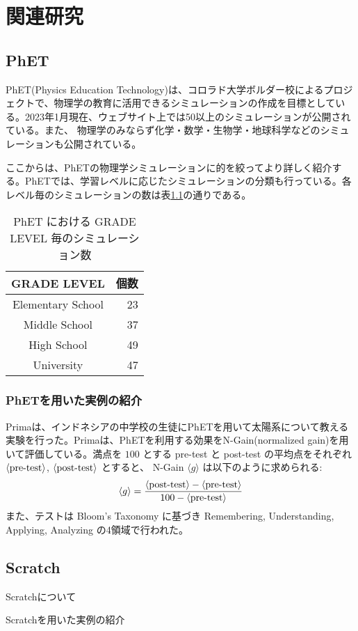 \chapter{関連研究} \label{related}

\section{PhET}

PhET(Physics Education Technology)\cite{Perkins2006PhETIS}は、コロラド大学ボルダー校によるプロジェクトで、物理学の教育に活用できるシミュレーションの作成を目標としている。2023年1月現在、ウェブサイト\cite{PhET}上では50以上のシミュレーションが公開されている。また、
物理学のみならず化学・数学・生物学・地球科学などのシミュレーションも公開されている。

ここからは、PhETの物理学シミュレーションに的を絞ってより詳しく紹介する。PhETでは、学習レベルに応じたシミュレーションの分類も行っている。各レベル毎のシミュレーションの数は表\ref{PhET_sim_count_table}の通りである。

\begin{table}[htb]
\label{PhET_sim_count_table}
\centering
\caption{PhET における GRADE LEVEL 毎のシミュレーション数}
\begin{tabular}{cr}
  GRADE LEVEL & 個数 \\
  \hline
  Elementary School & 23 \\
  Middle School & 37 \\
  High School & 49 \\
  University & 47 \\
\end{tabular}
\end{table}

\subsection{PhETを用いた実例の紹介}

Prima\cite{prima_learning_2018}は、インドネシアの中学校の生徒にPhETを用いて太陽系について教える実験を行った。Primaは、PhETを利用する効果をN-Gain(normalized gain)を用いて評価している。満点を $100$ とする pre-test と post-test の平均点をそれぞれ $\langle \textrm{pre\\-test} \rangle$, $\langle \textrm{post\\-test} \rangle$ とすると、 N-Gain $\langle g \rangle$ は以下のように求められる:
$$ \langle g \rangle = \dfrac{\langle \textrm{post\\-test} \rangle - \langle \textrm{pre\\-test} \rangle}{100 - \langle \textrm{pre\\-test} \rangle} $$
また、テストは Bloom's Taxonomy に基づき Remembering, Understanding, Applying, Analyzing の4領域で行われた。


\cite{rehman_teaching_2021}

\section{Scratch}

Scratch\cite{Scratch}について

Scratchを用いた実例の紹介
\cite{Lpez2015ScratchAA}

